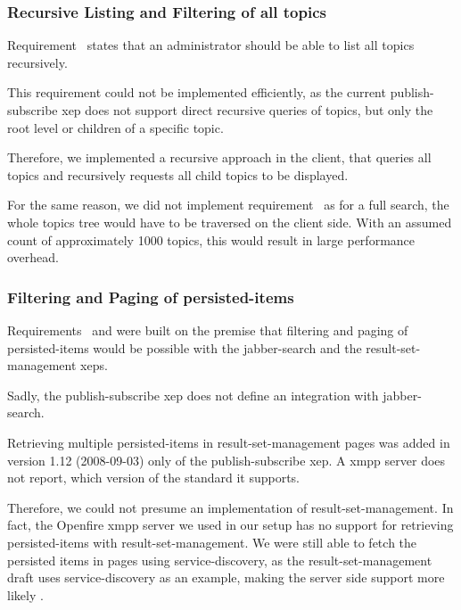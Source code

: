 \subsubsection{Recursive Listing and Filtering of all \glspl{topic}}

Requirement~ states that an administrator should be able to list all topics recursively.

This requirement could not be implemented efficiently, as the current \gls{publish-subscribe} \gls{xep} does not support direct recursive queries of \glspl{topic}, but only the root level or children of a specific \gls{topic}.

Therefore, we implemented a recursive approach in the client, that queries all \glspl{topic} and recursively requests all child \glspl{topic} to be displayed.

For the same reason, we did not implement requirement~ as for a full search, the whole \glspl{topic} tree would have to be traversed on the client side.
With an assumed count of approximately 1000 \glspl{topic}, this would result in large performance overhead.

\subsubsection{Filtering and Paging of \glspl{persisted-item}}

Requirements~ and  were built on the premise that filtering and paging of \glspl{persisted-item} would be possible with the \gls{jabber-search} \cite{xep-0055} and the  \gls{result-set-management} \cite{xep-0059} \glspl{xep}.

Sadly, the \gls{publish-subscribe} \gls{xep} does not define an integration with \gls{jabber-search}.

Retrieving multiple \glspl{persisted-item} in \gls{result-set-management} pages was added in version 1.12 (2008-09-03) only of the \gls{publish-subscribe} \gls{xep}.
A \gls{xmpp} server does not report, which version of the standard it supports.

Therefore, we could not presume an implementation of \gls{result-set-management}.
In fact, the Openfire \gls{xmpp} server we used in our setup has no support for retrieving \glspl{persisted-item} with \gls{result-set-management}. We were still able to fetch the persisted items in pages using \gls{service-discovery}, as the \gls{result-set-management} draft uses service-discovery as an example, making the server side support more likely \cite{xep-0059}.

